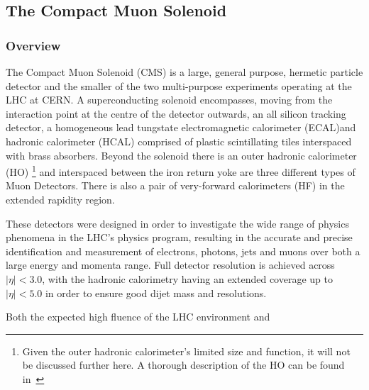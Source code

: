 \subsection{The Compact Muon Solenoid}\label{subsec:cms}

\subsubsection{Overview}
The Compact Muon Solenoid (CMS) is a large, general purpose, hermetic particle detector and the smaller of the two multi-purpose experiments operating at the LHC at CERN.
A superconducting solenoid encompasses, moving from the interaction point at the centre of the detector outwards, an all silicon tracking detector, a homogeneous lead tungstate electromagnetic calorimeter (ECAL)and hadronic calorimeter (HCAL) comprised of plastic scintillating tiles interspaced with brass absorbers.
Beyond the solenoid there is an outer hadronic calorimeter (HO) \footnote{Given the outer hadronic calorimeter's limited size and function, it will not be discussed further here. A thorough description of the HO can be found in~\cite{HO}} and interspaced between the iron return yoke are three different types of Muon Detectors.
There is also a pair of very-forward calorimeters (HF) in the extended rapidity region\cite{oldcms}.

These detectors were designed in order to investigate the wide range of physics phenomena in the LHC's physics program, resulting in the accurate and precise identification and measurement of electrons, photons, jets and muons over both a large energy and momenta range.
Full detector resolution is achieved across $|\eta| < 3.0$, with the hadronic calorimetry having an extended coverage up to $|\eta| < 5.0$ in order to ensure good dijet mass and \MET resolutions.

Both the expected high fluence of the LHC environment and 


